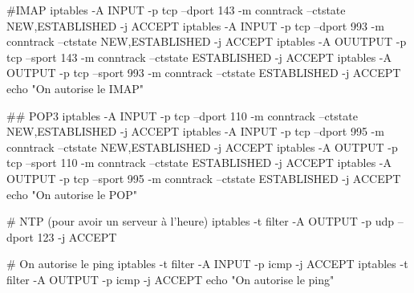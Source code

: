 \documentclass[a4paper,12pt,french]{report} %
\begin{document}
\begin{exempleConsole}
#IMAP
iptables -A INPUT -p tcp --dport 143 -m conntrack --ctstate NEW,ESTABLISHED -j ACCEPT
iptables -A INPUT -p tcp --dport 993 -m conntrack --ctstate NEW,ESTABLISHED -j ACCEPT
iptables -A OUUTPUT -p tcp --sport 143 -m conntrack --ctstate ESTABLISHED -j ACCEPT
iptables -A OUTPUT -p tcp --sport 993 -m conntrack --ctstate ESTABLISHED -j ACCEPT
echo "On autorise le IMAP"

## POP3
iptables -A INPUT -p tcp --dport 110 -m conntrack --ctstate NEW,ESTABLISHED -j ACCEPT
iptables -A INPUT -p tcp --dport 995 -m conntrack --ctstate NEW,ESTABLISHED -j ACCEPT
iptables -A OUTPUT -p tcp --sport 110 -m conntrack --ctstate ESTABLISHED -j ACCEPT
iptables -A OUTPUT -p tcp --sport 995 -m conntrack --ctstate ESTABLISHED -j ACCEPT
echo "On autorise le POP"

# NTP (pour avoir un serveur à l'heure)
iptables -t filter -A OUTPUT -p udp --dport 123 -j ACCEPT

# On autorise le ping
iptables -t filter -A INPUT -p icmp -j ACCEPT
iptables -t filter -A OUTPUT -p icmp -j ACCEPT
echo "On autorise le ping"

\end{exempleConsole}

\end{document}
